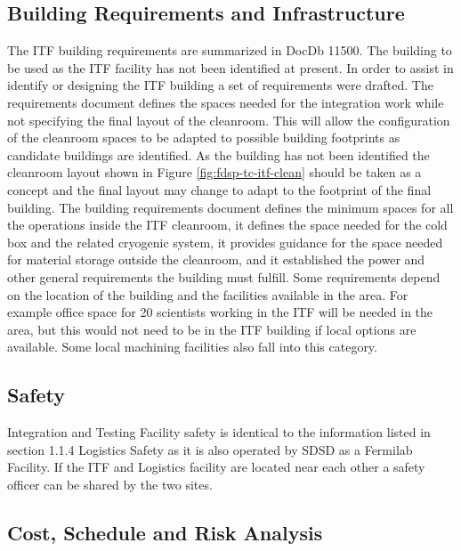 \subsection{Building Requirements and Infrastructure}
\label{sec:fdsp-tc-itf-req}
The ITF building requirements are summarized in DocDb 11500.\cite{bib:docdb11500} The building to be used as the ITF facility has not been identified at present. In order to assist in identify or designing the ITF building a set of requirements were drafted. The requirements document defines the spaces needed for the integration work while not specifying the final layout of the cleanroom. This will allow the configuration of the cleanroom spaces to be adapted to possible building footprints as candidate buildings are identified. As the building has not been identified the cleanroom layout shown in Figure \ref{fig:fdsp-tc-itf-clean} should be taken as a concept and the final layout may change to adapt to the footprint of the final building. The building requirements document\cite{docdb-11500}  defines the minimum spaces for all the operations inside the ITF cleanroom, it defines the space needed for the cold box and the related cryogenic system, it provides guidance for the space needed for material storage outside the cleanroom, and it established the power and other general requirements the building must fulfill. Some requirements depend on the location of the building and the facilities available in the area. For example office space for 20 scientists working in the ITF will be needed in the area, but this would not need to be in the ITF building if local options are available. Some local machining facilities also fall into this category. 

\subsection{Safety}
\label{sec:fdsp-tc-itf-safety}

Integration and Testing Facility safety is identical to the information listed in section 1.1.4 Logistics Safety as it is also operated by SDSD as a Fermilab Facility.    If the ITF and Logistics facility are located near each other a safety officer can be shared by the two sites.    

\subsection{Cost, Schedule and Risk Analysis}
\label{sec:fdsp-tc-itf-cost}

